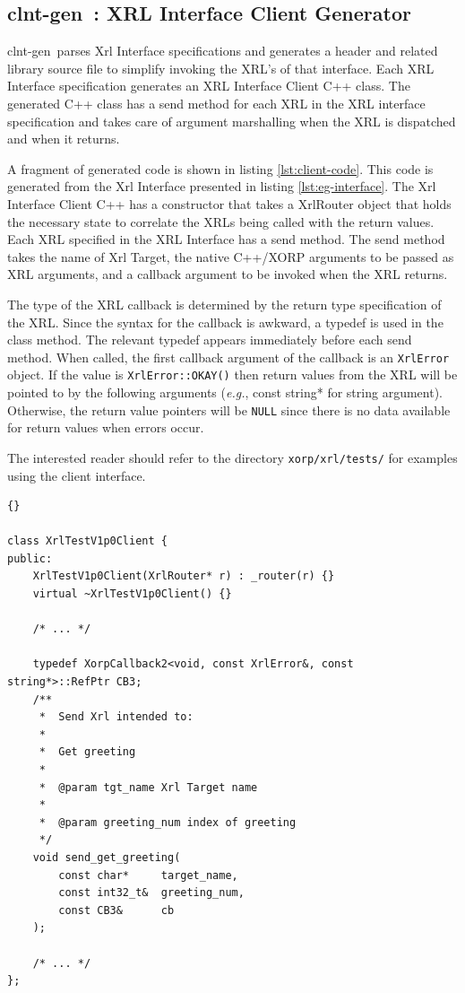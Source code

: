 \documentclass[11pt]{article}
\newcommand{\eg}{\emph{e.g.\/}} %
\newcommand{\clntgen}{{\sf clnt-gen}~}
\begin{document}
\subsection{\clntgen : XRL Interface Client Generator}

\clntgen parses Xrl Interface specifications and generates a header
and related library source file to simplify invoking the XRL's of that
interface.  Each XRL Interface specification generates an XRL
Interface Client C++ class.  The generated C++ class has a send method
for each XRL in the XRL interface specification and takes care of
argument marshalling when the XRL is dispatched and when it returns.

A fragment of generated code is shown in listing \ref{lst:client-code}.
This code is generated from the Xrl Interface presented in listing
\ref{lst:eg-interface}.  The Xrl Interface Client C++ has a constructor
that takes a XrlRouter object that holds the necessary state to
correlate the XRLs being called with the return values.  Each XRL
specified in the XRL Interface has a send method.  The send method
takes the name of Xrl Target, the native C++/XORP arguments to be
passed as XRL arguments, and a callback argument to be invoked when
the XRL returns.

The type of the XRL callback is determined by the return type
specification of the XRL.  Since the syntax for the callback is awkward,
a typedef is used in the class method.  The relevant typedef appears
immediately before each send method.  When called, the first callback
argument of the callback is an {\tt XrlError} object.  If the value is
{\tt XrlError::OKAY()} then return values from the XRL will be pointed
to by the following arguments (\eg, const string* for string argument).
Otherwise, the return value pointers will be {\tt NULL} since there is
no data available for return values when errors occur.

The interested reader should refer to the directory {\tt xorp/xrl/tests/}
for examples using the client interface.

\newpage
\begin{lstlisting}[caption={ Fragment of a C++ XRL Client. %
                                     \label{lst:client-code} } ]{}

class XrlTestV1p0Client {
public:
    XrlTestV1p0Client(XrlRouter* r) : _router(r) {}
    virtual ~XrlTestV1p0Client() {}

    /* ... */

    typedef XorpCallback2<void, const XrlError&, const string*>::RefPtr CB3;
    /**
     *  Send Xrl intended to:
     *  
     *  Get greeting
     *  
     *  @param tgt_name Xrl Target name
     *  
     *  @param greeting_num index of greeting
     */
    void send_get_greeting(
        const char*     target_name, 
        const int32_t&  greeting_num, 
        const CB3&      cb
    );

    /* ... */
};
\end{lstlisting}
\end{document}
